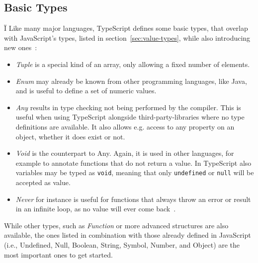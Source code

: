 \subsection{Basic Types}
\label{sec:ts-basic-types}
Ï
Like many major languages, TypeScript defines some basic types, that overlap with JavaScript's types, listed in section~\ref{sec:value-types}, while also introducing new ones~\cite{TypeScriptHandbook:BasicTypes}:
\begin{itemize}
  \item \emph{Tuple} is a special kind of an array, only allowing a fixed number of elements.
  \item \emph{Enum} may already be known from other programming languages, like Java, and is useful to define a set of numeric values.
  \item \emph{Any} results in type checking not being performed by the compiler. This is useful when using TypeScript alongside third-party-libraries where no type definitions are available. It also allows e.g. access to any property on an object, whether it does exist or not.
  \item \emph{Void} is the counterpart to Any. Again, it is used in other languages, for example to annotate functions that do not return a value. In TypeScript also variables may be typed as \texttt{void}, meaning that only \texttt{undefined} or \texttt{null} will be accepted as value.
  \item \emph{Never} for instance is useful for functions that always throw an error or result in an infinite loop, as no value will ever come back~\cite{TypeScriptHandbook:BasicTypes}.
\end{itemize}
While other types, such as \emph{Function} or more advanced structures are also available, the ones listed in combination with those already defined in JavaScript (i.e., Undefined, Null, Boolean, String, Symbol, Number, and Object) are the most important ones to get started.


